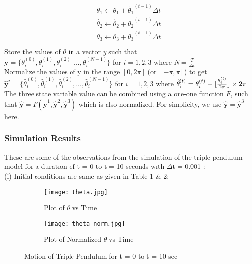 \begin{align}
\begin{split}
\dot{\theta_{1}} \leftarrow \dot{\theta_{1}} + \ddot{\theta_{1}}^{(t+1)}\Delta t \\
\dot{\theta_{2}} \leftarrow \dot{\theta_{2}} + \ddot{\theta_{2}}^{(t+1)}\Delta t \\
\dot{\theta_{3}} \leftarrow \dot{\theta_{3}} + \ddot{\theta_{3}}^{(t+1)}\Delta t \\  
\end{split}
\end{align}
Store the values of $\theta$ in a vector $y$ such that\\
$\textbf{y} = \{\theta^{(0)}_{i},\theta^{(1)}_{i},\theta^{(2)}_{i}, ... ,\theta^{(N-1)}_{i}\}$ for $i = 1,2,3$ where $N=\frac{T}{\Delta t}$\\
Normalize the values of y in the range $[0,2\pi]$ (or $[-\pi,\pi]$) to get\\ 
$\hat{\textbf{y}}^{i} = \{\hat{\theta}^{(0)}_{i},\hat{\theta}^{(1)}_{i},\hat{\theta}^{(2)}_{i}, ... ,\hat{\theta}^{(N-1)}_{i}\}$ for  $i = 1,2,3$
where $\hat{\theta}^{(t)}_{i} = \theta^{(t)}_{i} - \lfloor\frac{\theta^{(t)}_{i}}{2\pi}\rfloor\times 2\pi$\\
The three state variable value can be combined using a one-one function $F$, such that $\hat{\textbf{y}}  = F(\hat{\textbf{y}}^{1},\hat{\textbf{y}}^{2},\hat{\textbf{y}}^{3})$ which is also normalized. For simplicity, we use $\hat{\textbf{y}} = \hat{\textbf{y}}^{3}$ here.

\subsubsection{Simulation Results}
These are some of the observations from the simulation of the triple-pendulum model for a duration of t = 0 to t = 10 seconds with $\Delta$t = 0.001 :\\
(i) Initial conditions are same as given in Table 1 \& 2:\\
 
\begin{figure}[H]
\begin{subfigure}{0.5\textwidth}
\texttt{[image: theta.jpg]}
\caption{Plot of ${\theta}$ vs Time}\label{fig:theta}
\end{subfigure}
\begin{subfigure}{0.5\textwidth}
\texttt{[image: theta\_norm.jpg]}
\caption{Plot of Normalized ${\theta}$ vs Time}\label{fig:theta_norm}
\end{subfigure}
\caption{Motion of Triple-Pendulum for t = 0 to t = 10 sec}\label{fig:image3}
\end{figure}

